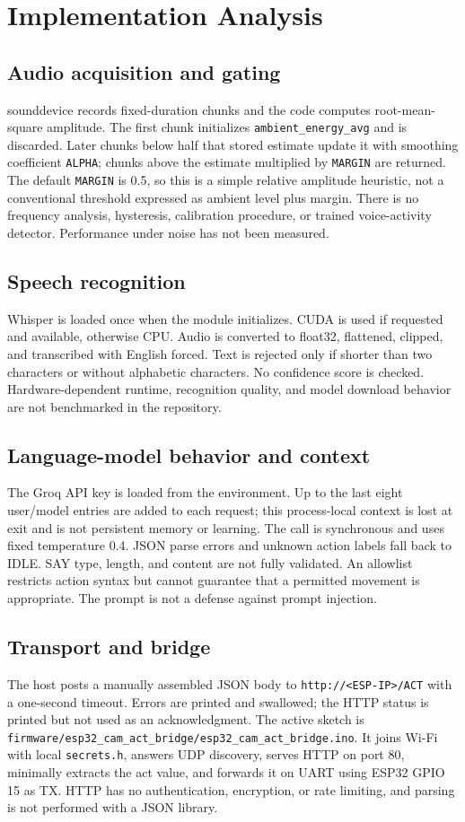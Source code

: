 \documentclass[12pt,a4paper]{report}
\begin{document}
\chapter{Implementation Analysis}
\section{Audio acquisition and gating}
sounddevice records fixed-duration chunks and the code computes root-mean-square amplitude. The first chunk initializes \texttt{ambient\_energy\_avg} and is discarded. Later chunks below half that stored estimate update it with smoothing coefficient \texttt{ALPHA}; chunks above the estimate multiplied by \texttt{MARGIN} are returned. The default \texttt{MARGIN} is 0.5, so this is a simple relative amplitude heuristic, not a conventional threshold expressed as ambient level plus margin. There is no frequency analysis, hysteresis, calibration procedure, or trained voice-activity detector. Performance under noise has not been measured.
\section{Speech recognition}
Whisper is loaded once when the module initializes. CUDA is used if requested and available, otherwise CPU. Audio is converted to float32, flattened, clipped, and transcribed with English forced. Text is rejected only if shorter than two characters or without alphabetic characters. No confidence score is checked. Hardware-dependent runtime, recognition quality, and model download behavior are not benchmarked in the repository.
\section{Language-model behavior and context}
The Groq API key is loaded from the environment. Up to the last eight user/model entries are added to each request; this process-local context is lost at exit and is not persistent memory or learning. The call is synchronous and uses fixed temperature 0.4. JSON parse errors and unknown action labels fall back to IDLE. SAY type, length, and content are not fully validated. An allowlist restricts action syntax but cannot guarantee that a permitted movement is appropriate. The prompt is not a defense against prompt injection.
\section{Transport and bridge}
The host posts a manually assembled JSON body to \texttt{http://<ESP-IP>/ACT} with a one-second timeout. Errors are printed and swallowed; the HTTP status is printed but not used as an acknowledgment. The active sketch is \texttt{firmware/esp32\_cam\_act\_bridge/esp32\_cam\_act\_bridge.ino}. It joins Wi-Fi with local \texttt{secrets.h}, answers UDP discovery, serves HTTP on port 80, minimally extracts the act value, and forwards it on UART using ESP32 GPIO 15 as TX. HTTP has no authentication, encryption, or rate limiting, and parsing is not performed with a JSON library.
\end{document}
